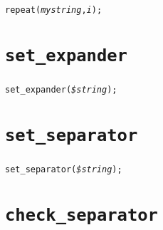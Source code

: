 \documentclass[a4paper,10pt]{report}
\begin{document}
\subsubsection{\format}

\begin{boxnote}
\begin{alltt}
repeat(\textit{mystring}, \textit{i});
\end{alltt}
\end{boxnote}
\vspace{\baselineskip}


\section{\texttt{set\_expander}}

\subsubsection{\format}

\begin{boxnote}
\begin{alltt}
set_expander(\textit{\$string});
\end{alltt}
\end{boxnote}
\vspace{\baselineskip}

\section{\texttt{set\_separator}}

\subsubsection{\format}

\begin{boxnote}
\begin{alltt}
set_separator(\textit{\$string});
\end{alltt}
\end{boxnote}
\vspace{\baselineskip}

\section{\texttt{check\_separator}}

\subsubsection{\format}
\end{document}
